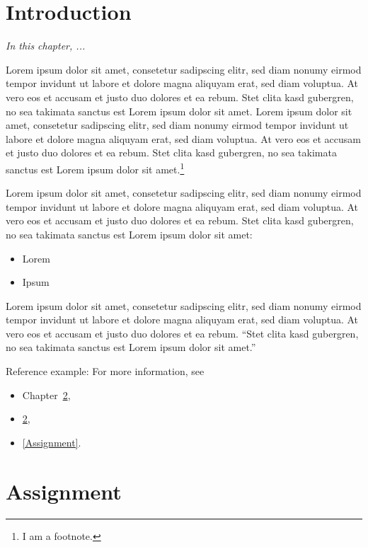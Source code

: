 \documentclass[
	12pt,
	a4paper,
	BCOR10mm,
	DIV14,
	headsepline,
]{scrreprt}
\begin{document}
\tableofcontents

\chapter{Introduction}
\label{Introduction}

\textit{%
In this chapter, ...
}

\bigskip

Lorem ipsum dolor sit amet, consetetur sadipscing elitr, sed diam nonumy eirmod tempor invidunt ut labore et dolore magna aliquyam erat, sed diam voluptua.
At vero eos et accusam et justo duo dolores et ea rebum.
Stet clita kasd gubergren, no sea takimata sanctus est Lorem ipsum dolor sit amet.
Lorem ipsum dolor sit amet, consetetur sadipscing elitr, sed diam nonumy eirmod tempor invidunt ut labore et dolore magna aliquyam erat, sed diam voluptua.
At vero eos et accusam et justo duo dolores et ea rebum.
Stet clita kasd gubergren, no sea takimata sanctus est Lorem ipsum dolor sit amet.\footnote{I am a footnote.}

Lorem ipsum dolor sit amet, consetetur sadipscing elitr, sed diam nonumy eirmod tempor invidunt ut labore et dolore magna aliquyam erat, sed diam voluptua.
At vero eos et accusam et justo duo dolores et ea rebum.
Stet clita kasd gubergren, no sea takimata sanctus est Lorem ipsum dolor sit amet:

\begin{itemize}
	\item Lorem
	\item Ipsum
\end{itemize}

Lorem ipsum dolor sit amet, consetetur sadipscing elitr, sed diam nonumy eirmod tempor invidunt ut labore et dolore magna aliquyam erat, sed diam voluptua.
At vero eos et accusam et justo duo dolores et ea rebum.
“Stet clita kasd gubergren, no sea takimata sanctus est Lorem ipsum dolor sit amet.”~\cite{Quelle2012}

\medskip

Reference example: For more information, see
\begin{itemize}
	\item Chapter~\ref{Assignment},
	\item \cref{Assignment},
	\item \vref{Assignment}.
\end{itemize}

\chapter{Assignment}
\label{Assignment}
\end{document}
